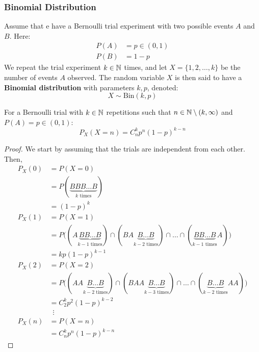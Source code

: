 \documentclass{article}
\begin{document}
	\subsubsection{Binomial Distribution}
		Assume that e have a Bernoulli trial experiment with two possible events $A$ and $B$. Here:
		\begin{align*}
			P(A) &= p \in (0,1) \\
			P(B) &= 1-p
		\end{align*}
		We repeat the trial experiment $k\in \mathbb{N}$ times, and let $X = \{1, 2, \dots, k\}$ be the number of events $A$ observed. The random variable $X$ is then said to have a \textbf{Binomial distribution} with parameters $k, p$, denoted:
		$$ X \sim \text{Bin}(k, p)$$
		\begin{prop}
			For a Bernoulli trial with $k\in \mathbb{N}$ repetitions such that $n \in \mathbb{N} \setminus (k, \infty)$ and \\$P(A) = p \in (0,1)$:
			$$ P_X(X=n) = C_n^k p^n (1-p)^{k-n}$$
		\end{prop}
		\begin{proof}
			We start by assuming that the trials are independent from each other. Then,
			\begin{align*}
				P_X(0) &= P(X=0)  \\
				&= P(\underbrace{B B B \dots B}_{k \text{ times}})  \\
				&= (1-p)^k \\
				P_X(1) &= P(X=1) \\
				&= P\big( (A\underbrace{BB\dots B}_{k-1 \text{ times}})  \cap (BA\underbrace{B\dots B}_{k-2 \text{ times}}) \cap \dots \cap (\underbrace{BB\dots B}_{k-1 \text{ times}}A)\big) \\
				&= k p (1-p)^{k-1} \\
				P_X(2) &= P(X=2) \\
				&= P\big( (AA\underbrace{B\dots B}_{k-2 \text{ times}})  \cap (BAA\underbrace{B\dots B}_{k-3 \text{ times}}) \cap \dots \cap (\underbrace{B\dots B}_{k-2 \text{ times}}AA)\big) \\
				&= C_2^k p^2 (1-p)^{k-2}\\
				&\,\, \, \vdots\\
				P_X(n) &= P(X=n)  \\
				&= C_n^k p^n (1-p)^{k-n}
 			\end{align*}
		\end{proof}
\end{document}
